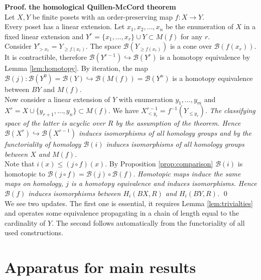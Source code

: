 \documentclass[english,12pt]{article}
\numberwithin{equation}{section}
\theoremstyle{definition}
\theoremstyle{remark}
\newenvironment{pf}{\noindent\textbf{Proof.}}{\qed}
\renewcommand{\geq}{\geqslant}
\begin{document}
\begin{pf} \textbf{the homological Quillen-McCord theorem}\\
Let $X, Y$ be finite posets with an order-preserving map $f : X \to Y$.\\

Every poset has a linear extension. Let $x_1, x_2, \ldots, x_n$ be the enumeration of $X$ in a fixed linear extension and $Y^r = \{x_1,\ldots,x_r\} \cup Y \subset M(f)$ for any $r$.\\

Consider $Y^r_{>x_r} = Y_{\geq f(x_r)}$. The space $\mathcal{B}(Y_{\geq f(x_r)})$ is a cone over $\mathcal{B}(f(x_r))$. It is contractible, therefore $\mathcal{B}(Y^{r-1}) \hookrightarrow \mathcal{B}(Y^{r})$ is a homotopy equivalence by Lemma \ref{lem:homotopy}. By iteration, the map $\mathcal{B}(j) : \mathcal{B}(Y^{0}) = \mathcal{B}(Y) \hookrightarrow \mathcal{B}(M(f)) = \mathcal{B}(Y^n)$ is a homotopy equivalence between $BY$ and $M(f)$.\\

Now consider a linear extension of $Y$ with enumeration $y_1,\ldots,y_m$ and $X^r = X \cup \{y_{r+1},\ldots,y_n\} \subset M(f)$. We have $X^{r-1}_{< y_r} = f^{-1}(Y_{\leqslant y_r})$. \textit{The classifying space of the latter is acyclic over $R$ by the assumption of the theorem. Hence $\mathcal{B}(X^{r}) \hookrightarrow \mathcal{B}(X^{r-1})$ induces isomorphisms of all homology groups and by the functoriality of homology $\mathcal{B}(i)$ induces isomorphisms of all homology groups between $X$ and $M(f)$.}\\

Note that $i(x) \leqslant (j \circ f)(x)$. By Proposition \ref{prop:comparison} $\mathcal{B}(i)$ is homotopic to $\mathcal{B}(j \circ f) = \mathcal{B}(j) \circ \mathcal{B}(f)$. \textit{Homotopic maps induce the same maps on homology, $j$ is a homotopy equivalence and induces isomorphisms. Hence $\mathcal{B}(f)$ induces isomorphisms between $H_i(BX,R)$ and $H_i(BY,R)$.}
\end{pf}\\

We see two updates. The first one is essential, it requires Lemma \ref{lem:trivialties} and operates some equivalence propagating in a chain of length equal to the cardinality of $Y$. The second follows automatically from the functoriality of all used constructions.

\section{Apparatus for main results}
\end{document}
